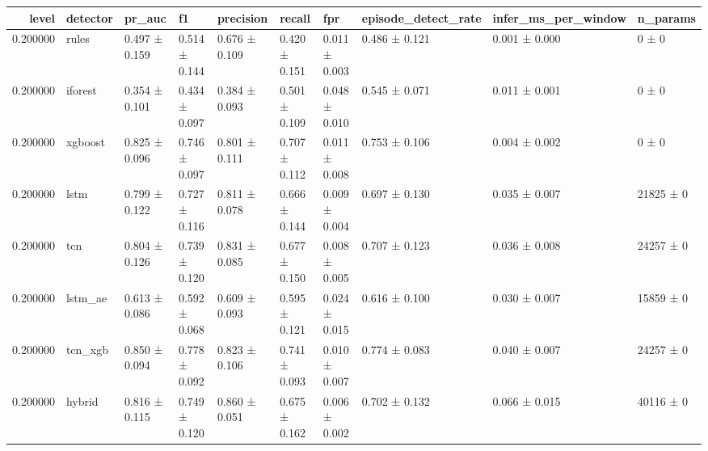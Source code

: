 \begin{tabular}{rlllllllll}
\toprule
level & detector & pr\_auc & f1 & precision & recall & fpr & episode\_detect\_rate & infer\_ms\_per\_window & n\_params \\
\midrule
0.200000 & rules & 0.497 ± 0.159 & 0.514 ± 0.144 & 0.676 ± 0.109 & 0.420 ± 0.151 & 0.011 ± 0.003 & 0.486 ± 0.121 & 0.001 ± 0.000 & 0 ± 0 \\
0.200000 & iforest & 0.354 ± 0.101 & 0.434 ± 0.097 & 0.384 ± 0.093 & 0.501 ± 0.109 & 0.048 ± 0.010 & 0.545 ± 0.071 & 0.011 ± 0.001 & 0 ± 0 \\
0.200000 & xgboost & 0.825 ± 0.096 & 0.746 ± 0.097 & 0.801 ± 0.111 & 0.707 ± 0.112 & 0.011 ± 0.008 & 0.753 ± 0.106 & 0.004 ± 0.002 & 0 ± 0 \\
0.200000 & lstm & 0.799 ± 0.122 & 0.727 ± 0.116 & 0.811 ± 0.078 & 0.666 ± 0.144 & 0.009 ± 0.004 & 0.697 ± 0.130 & 0.035 ± 0.007 & 21825 ± 0 \\
0.200000 & tcn & 0.804 ± 0.126 & 0.739 ± 0.120 & 0.831 ± 0.085 & 0.677 ± 0.150 & 0.008 ± 0.005 & 0.707 ± 0.123 & 0.036 ± 0.008 & 24257 ± 0 \\
0.200000 & lstm\_ae & 0.613 ± 0.086 & 0.592 ± 0.068 & 0.609 ± 0.093 & 0.595 ± 0.121 & 0.024 ± 0.015 & 0.616 ± 0.100 & 0.030 ± 0.007 & 15859 ± 0 \\
0.200000 & tcn\_xgb & 0.850 ± 0.094 & 0.778 ± 0.092 & 0.823 ± 0.106 & 0.741 ± 0.093 & 0.010 ± 0.007 & 0.774 ± 0.083 & 0.040 ± 0.007 & 24257 ± 0 \\
0.200000 & hybrid & 0.816 ± 0.115 & 0.749 ± 0.120 & 0.860 ± 0.051 & 0.675 ± 0.162 & 0.006 ± 0.002 & 0.702 ± 0.132 & 0.066 ± 0.015 & 40116 ± 0 \\
\bottomrule
\end{tabular}
